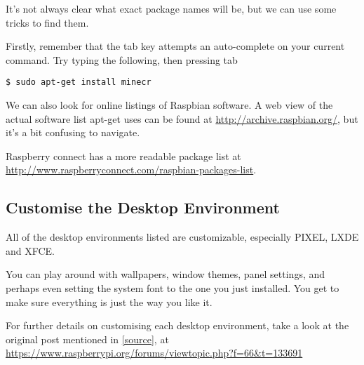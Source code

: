 			It's not always clear what exact package names will be, but we can use some tricks to find them.
			
			Firstly, remember that the tab key attempts an auto-complete on your current command. Try typing the following, then pressing tab
	
	\begin{lstlisting}[style=Terminal]
$ sudo apt-get install minecr
	\end{lstlisting}
	
			We can also look for online listings of Raspbian software. A web view of the actual software list apt-get uses can be found at \url{http://archive.raspbian.org/}, but it's a bit confusing to navigate.
			
			Raspberry connect has a more readable package list at \url{http://www.raspberryconnect.com/raspbian-packages-list}.
	
	\subsection*{Customise the Desktop Environment}

		All of the desktop environments listed are customizable, especially PIXEL, LXDE and XFCE.
		
		You can play around with wallpapers, window themes, panel settings, and perhaps even setting the system font to the one you just installed. You get to make sure everything is just the way you like it.
		
		For further details on customising each desktop environment, take a look at the original post mentioned in \autoref{source}, at \url{https://www.raspberrypi.org/forums/viewtopic.php?f=66&t=133691}